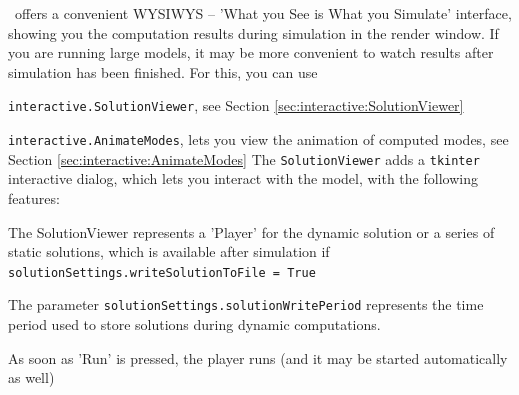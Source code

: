 \label{secSolutionViewer}
\codeName\ offers a convenient WYSIWYS -- 'What you See is What you Simulate' interface, showing you the computation results during simulation in the render window.
If you are running large models, it may be more convenient to watch results after simulation has been finished.
For this, you can use
\bi
  \item \texttt{interactive.SolutionViewer}, see Section \ref{sec:interactive:SolutionViewer}
  \item \texttt{interactive.AnimateModes}, lets you view the animation of computed modes, see Section \ref{sec:interactive:AnimateModes}
\ei
{}
The \texttt{SolutionViewer} adds a \texttt{tkinter} interactive dialog, which lets you interact with the model, with the following features:
\bi
\item The SolutionViewer represents a 'Player' for the dynamic solution or a series of static solutions, which is available after simulation if \texttt{solutionSettings.writeSolutionToFile = True}
\item The parameter \texttt{solutionSettings.solutionWritePeriod} represents the time period used to store solutions during dynamic computations.
\item As soon as 'Run' is pressed, the player runs (and it may be started automatically as well)
